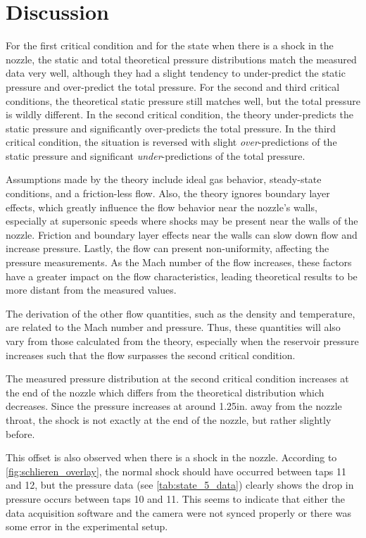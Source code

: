 \chapter{Discussion}
\label{cp:discussion}

For the first critical condition and for the state when there is a shock in the nozzle, the static and total theoretical pressure distributions match the measured data very well, although they had a slight tendency to under-predict the static pressure and over-predict the total pressure. For the second and third critical conditions, the theoretical static pressure still matches well, but the total pressure is wildly different. In the second critical condition, the theory under-predicts the static pressure and significantly over-predicts the total pressure. In the third critical condition, the situation is reversed with slight \textit{over}-predictions of the static pressure and significant \textit{under}-predictions of the total pressure.

Assumptions made by the theory include ideal gas behavior, steady-state conditions, and a friction-less flow. Also, the theory ignores boundary layer effects, which greatly influence the flow behavior near the nozzle's walls, especially at supersonic speeds where shocks may be present near the walls of the nozzle. Friction and boundary layer effects near the walls can slow down flow and increase pressure. Lastly, the flow can present non-uniformity, affecting the pressure measurements. As the Mach number of the flow increases, these factors have a greater impact on the flow characteristics, leading theoretical results to be more distant from the measured values.

The derivation of the other flow quantities, such as the density and temperature, are related to the Mach number and pressure. Thus, these quantities will also vary from those calculated from the theory, especially when the reservoir pressure increases such that the flow surpasses the second critical condition.

The measured pressure distribution at the second critical condition increases at the end of the nozzle which differs from the theoretical distribution which decreases. Since the pressure increases at around \num{1.25}in. away from the nozzle throat, the shock is not exactly at the end of the nozzle, but rather slightly before.

This offset is also observed when there is a shock in the nozzle. According to \autoref{fig:schlieren_overlay}, the normal shock should have occurred between taps \num{11} and \num{12}, but the pressure data (see \autoref{tab:state_5_data}) clearly shows the drop in pressure occurs between taps \num{10} and \num{11}. This seems to indicate that either the data acquisition software and the camera were not synced properly or there was some error in the experimental setup.

